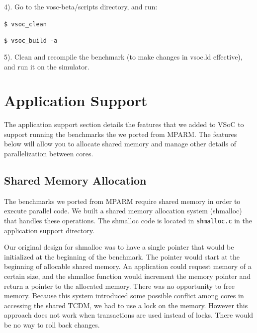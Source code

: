 \documentclass{article}
\begin{document}
\vspace{2mm}
4). Go to the vosc-beta/scripts directory, and run:

{
\addtolength{\leftskip}{6mm}

\hspace{5mm}\texttt{\$ vsoc\_clean}

\hspace{5mm}\texttt{\$ vsoc\_build -a}

}

\vspace{2mm}
5). Clean and recompile the benchmark (to make changes in vsoc.ld effective), and run it on the simulator.

\newpage

\section{Application Support}

The application support section details the features that we added to VSoC to support running the 
benchmarks the we ported from MPARM.  The features below will allow you to allocate shared memory
and manage other details of parallelization between cores.

\subsection{Shared Memory Allocation}

The benchmarks we ported from MPARM require shared memory in order to execute parallel code.  We built a
shared memory allocation system (shmalloc) that handles these operations.  The shmalloc code is located in
\verb|shmalloc.c| in the application support directory. 

Our original design for shmalloc was to have a single pointer that would be initialized at the beginning of the 
benchmark.  The pointer would start at the beginning of allocable shared memory.  An application could request
memory of a certain size, and the shmalloc function would increment the memory pointer and return a pointer
to the allocated memory.  There was no opportunity to free memory. 
Because this system introduced some possible conflict among cores in accessing the
shared TCDM, we had to use a lock on the memory.  However this approach does not work when transactions
are used instead of locks.  There would be no way to roll back changes. 
\end{document}
